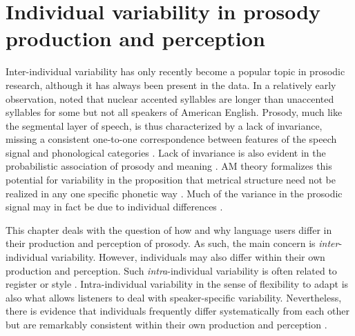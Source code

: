 \chapter{Individual variability in prosody production and perception} \label{ch:background variability}

Inter-individual variability has only recently become a popular topic in prosodic research, although it has always been present in the data. In a relatively early observation, \citet{beckmanArticulatoryEvidenceDifferentiating1994} noted that nuclear accented syllables are longer than unaccented syllables for some but not all speakers of American English. Prosody, much like the segmental layer of speech, is thus characterized by a lack of invariance, missing a consistent one-to-one correspondence between features of the speech signal and phonological categories \citep{perkellInvarianceVariabilitySpeech1986, niebuhrPerzeptionUndKognitive2007, kurumadaThinkingProbabilisticallyStudy2021,  arvanitiVariabilityOverlapCue2024}. Lack of invariance is also evident in the probabilistic association of prosody and meaning \citep[e.g.,][]{hirschbergCommunicationProsodyFunctional2002, calhounCentralityMetricalStructure2010}. AM theory formalizes this potential for variability in the proposition that metrical structure need not be realized in any one specific phonetic way \citep[55]{laddIntonationalPhonology2008}. Much of the variance in the prosodic signal may in fact be due to individual differences \citep{arvanitiVariabilityOverlapCue2024}. 

This chapter deals with the question of how and why language users differ in their production and perception of prosody. As such, the main concern is \textit{inter}-individual variability. However, individuals may also differ within their own production and perception. Such \textit{intra}-individual variability is often related to register or style \citep[for a review and systematization of intra-individual variability, see][]{ulbrichWhatIntraindividualVariation2021}. Intra-individual variability in the sense of flexibility to adapt is also what allows listeners to deal with speaker-specific variability. Nevertheless, there is evidence that individuals frequently differ systematically from each other but are remarkably consistent within their own production and perception \citep{ouyangIndividualDifferencesProsodic2015, giovannoneIndividualDifferencesLexical2023}.

